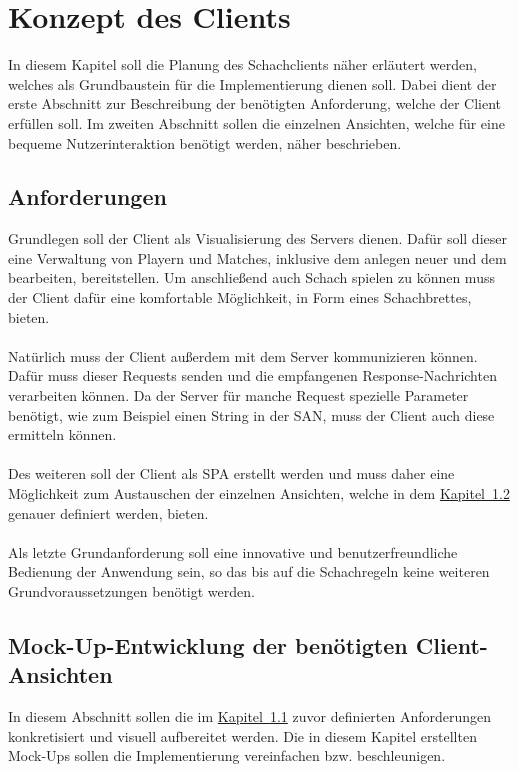 
\chapter{Konzept des Clients}
In diesem Kapitel soll die Planung des Schachclients näher erläutert werden, welches als Grundbaustein für die Implementierung dienen soll. Dabei dient der erste Abschnitt zur Beschreibung der benötigten Anforderung, welche der Client erfüllen soll. Im zweiten Abschnitt sollen die einzelnen Ansichten, welche für eine bequeme Nutzerinteraktion benötigt werden, näher beschrieben. 

\section{Anforderungen}\label{sec:anforderungenClient}
Grundlegen soll der Client als Visualisierung des Servers dienen. Dafür soll dieser eine Verwaltung von Playern und Matches, inklusive dem anlegen neuer und dem bearbeiten, bereitstellen. Um anschließend auch Schach spielen zu können muss der Client dafür eine komfortable Möglichkeit, in Form eines Schachbrettes, bieten.\\
\\
Natürlich muss der Client außerdem mit dem Server kommunizieren können. Dafür muss dieser Requests senden und die empfangenen Response-Nachrichten verarbeiten können. Da der Server für manche Request spezielle Parameter benötigt, wie zum Beispiel einen String in der \gls{SAN}, muss der Client auch diese ermitteln können.\\
\\
Des weiteren soll der Client als \gls{SPA} erstellt werden und muss daher eine Möglichkeit zum Austauschen der einzelnen Ansichten, welche in dem \hyperref[sec:views]{Kapitel~\ref{sec:views}} genauer definiert werden, bieten.\\
\\
Als letzte Grundanforderung soll eine innovative und benutzerfreundliche Bedienung der Anwendung sein, so das bis auf die Schachregeln keine weiteren Grundvoraussetzungen benötigt werden.

\section{Mock-Up-Entwicklung der benötigten Client-Ansichten}\label{sec:views}
In diesem Abschnitt sollen die im \hyperref[sec:anforderungenClient]{Kapitel~\ref{sec:anforderungenClient}} zuvor definierten Anforderungen konkretisiert und visuell aufbereitet werden. Die in diesem Kapitel erstellten Mock-Ups sollen die Implementierung vereinfachen bzw. beschleunigen.

